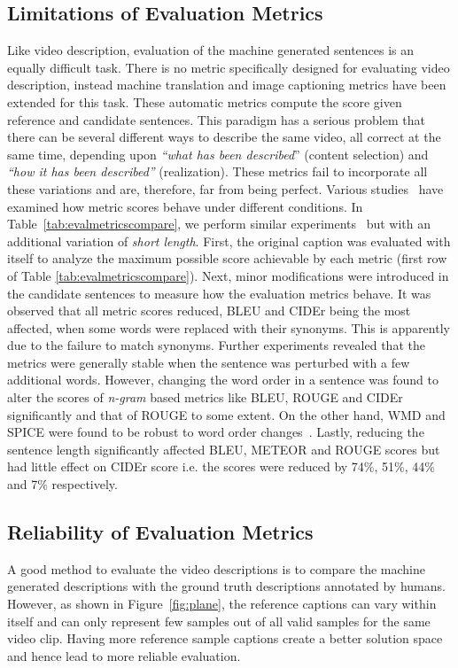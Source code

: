 \documentclass[10pt,journal,compsoc]{IEEEtran}
\begin{document}
\subsection{Limitations of Evaluation Metrics}
Like video description, evaluation of the machine generated sentences is an equally difficult task. There is no metric specifically designed for evaluating video description, instead machine translation and image captioning metrics have been extended for this task. These automatic metrics compute the score given reference and candidate sentences. This paradigm has a serious problem that there can be several different ways to describe the same video, all correct at the same time, depending upon \textit{``what has been described}'' (content selection) and \textit{``how it has been described''} (realization). These metrics fail to incorporate all these variations and are, therefore, far from being perfect. 
Various studies~\cite{kilickaya2016re, wang2016cross} have examined how metric scores behave under different conditions. In Table~\ref{tab:evalmetricscompare}, we perform similar experiments~\cite{kilickaya2016re} but with an additional variation of \emph{short length}. First, the original caption was evaluated with itself to analyze the maximum possible score achievable by each metric (first row of Table \ref{tab:evalmetricscompare}). Next, minor modifications were introduced in the candidate sentences to measure how the evaluation metrics behave. It was observed that all metric scores reduced, BLEU and CIDEr being the most affected, when some words were replaced with their synonyms. This is apparently due to the failure to match synonyms. Further experiments revealed that the metrics were generally stable when the sentence was perturbed with a few additional words. However, changing the word order in a sentence was found to alter the scores of {\em n-gram} based metrics like BLEU, ROUGE and CIDEr significantly and that of ROUGE to some extent. On the other hand, WMD and SPICE were found to be robust to word order changes~\cite{kilickaya2016re}. Lastly, reducing the sentence length significantly affected BLEU, METEOR and ROUGE scores but had little effect on CIDEr score i.e. the scores were reduced by 74\%, 51\%, 44\% and 7\% respectively.

\subsection{Reliability of Evaluation Metrics}
A good method to evaluate the video descriptions is to compare the machine generated descriptions with the ground truth descriptions annotated by humans. However, as shown in Figure~\ref{fig:plane}, the reference captions can vary within itself and can only represent few samples out of all valid samples for the same video clip. Having more reference sample captions create a better solution space and hence lead to more reliable evaluation.
\end{document}
